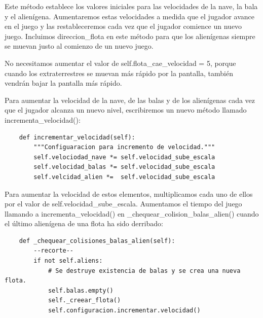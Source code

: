 Este método establece los valores iniciales para las velocidades de la nave, la bala y el alienígena. Aumentaremos estas 
velocidades a medida que el jugador avance en el juego y las restableceremos cada vez que el jugador comience un nuevo juego. 
Incluimos {\ttfamily direccion\_flota } en este método para que los alienígenas siempre se muevan justo al comienzo de un nuevo juego. 

No necesitamos aumentar el valor de {\ttfamily self.flota\_cae\_velocidad = 5}, porque cuando los extraterrestres se muevan más rápido por la pantalla, también vendrán bajar la pantalla más rápido.

Para aumentar la velocidad de la nave, de las balas y de los alienígenas cada vez que el
jugador alcanza un nuevo nivel, escribiremos un nuevo método llamado  {\ttfamily incrementa\_velocidad()}:

\hspace{-2.75cm}{\ttfamily \scriptsize configurar.py}  \vspace{-0.5cm}
\begin{lstlisting}	
    def incrementar_velocidad(self):
        """Configuaracion para incremento de velocidad."""
        self.velociodad_nave *= self.velocidad_sube_escala
        self.velocidad_balas *= self.velocidad_sube_escala
        self.velcidad_alien *=  self.velocidad_sube_escala
\end{lstlisting}

Para aumentar la velocidad de estos elementos, multiplicamos cada uno  de ellos por el valor 
de {\ttfamily self.velocidad\_sube\_escala}. 
Aumentamos el tiempo del juego llamando a  {\ttfamily incrementa\_velocidad()} en {\ttfamily \_chequear\_colision\_balas\_alien()} cuando el último alienígena de una flota ha sido derribado:


\hspace{-2.4cm}{\ttfamily \scriptsize invasión}

\vspace{-0.2cm}
\hspace{-2.1cm}{\ttfamily \scriptsize \_alien.py}\vspace{-0.84cm}
\begin{lstlisting}	
    def _chequear_colisiones_balas_alien(self):
        --recorte--
        if not self.aliens:
            # Se destruye existencia de balas y se crea una nueva flota.
            self.balas.empty()
            self._creear_flota()
            self.configuracion.incrementar.velocidad()
\end{lstlisting}

